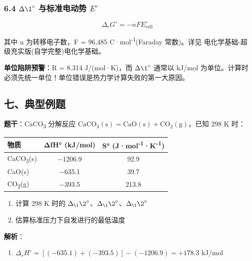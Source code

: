 \documentclass[a4paper,11pt]{ctexart}
\providecommand{\tightlist}{\setlength{\itemsep}{0pt}\setlength{\parskip}{0pt}}
\newcounter{none}
\begin{document}
\subsubsection{\texorpdfstring{6.4 \(\Delta \1^{\circ}\) 与标准电动势 \(E^{\circ}\)}{6.4 \textbackslash Delta \textbackslash1\^{}\{\textbackslash circ\} 与标准电动势 E\^{}\{\textbackslash circ\}}}\label{delta-1circ-ux4e0eux6807ux51c6ux7535ux52a8ux52bf-ecirc}

\[
\Delta_r G^\circ = -nFE^\circ_{\text{cell}}
\]

其中 n 为转移电子数，F = 96,485 C·mol\textsuperscript{-1}(Faraday 常数)。详见 电化学基础-超级充实版(自学完整)\textbar 电化学基础。

\textbf{单位陷阱预警}：R = 8.314 J/(mol·K)，而 \(\Delta \1^{\circ}\) 通常以 kJ/mol 为单位。计算时必须先统一单位！单位错误是热力学计算失败的第一大原因。

\subsection{七、典型例题}\label{ux4e03ux5178ux578bux4f8bux9898}

\textbf{题干}：CaCO\textsubscript{3} 分解反应 \(\mathrm{CaCO_3(s) = CaO(s) + CO_2(g)}\)，已知 298 K 时：

{\def\LTcaptype{none} %
\begin{longtable}[]{@{}lcc@{}}
\toprule\noalign{}
物质 & ΔfH° (kJ/mol) & S° (J·mol\textsuperscript{-1}·K\textsuperscript{-1}) \\
\midrule\noalign{}
\endhead
\bottomrule\noalign{}
\endlastfoot
CaCO\textsubscript{3}(s) & −1206.9 & 92.9 \\
CaO(s) & −635.1 & 39.7 \\
CO\textsubscript{2}(g) & −393.5 & 213.8 \\
\end{longtable}
}

\begin{enumerate}
\def\labelenumi{(\arabic{enumi})}
\tightlist
\item
  计算 298 K 时的 \(\Delta_{\1} \2^{\circ}\)、\(\Delta_{\1} \2^{\circ}\)、\(\Delta_{\1} \2^{\circ}\)
\item
  估算标准压力下自发进行的最低温度
\end{enumerate}

\textbf{解析}：

\begin{enumerate}
\def\labelenumi{(\arabic{enumi})}
\tightlist
\item
  \(\Delta_r H^\circ = [(-635.1) + (-393.5)] - (-1206.9) = +178.3\) kJ/mol
\end{enumerate}
\end{document}
